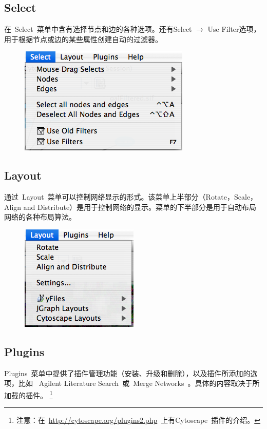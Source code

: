 	\subsection{Select}
	在~Select~菜单中含有选择节点和边的各种选项。还有Select $\rightarrow$ Use Filter选项，用于根据节点或边的某些属性创建自动的过滤器。

	\begin{figure}[!h]
	\centerline{\includegraphics[scale=0.6]{images/menu_select_26.png}}
	\end{figure}

	\subsection{Layout}
	通过~Layout~菜单可以控制网络显示的形式。该菜单上半部分（Rotate，Scale，Align and
	 Distribute）是用于控制网络的显示。菜单的下半部分是用于自动布局网络的各种布局算法。

	\begin{figure}[!h]
	\centerline{\includegraphics[scale=0.6]{images/menu_layout_25.png}}
	\end{figure}
	
		
	
	\subsection{Plugins}
	Plugins~菜单中提供了插件管理功能（安装、升级和删除），以及插件所添加的选项，比如
	~Agilent Literature Search~或~Merge Networks~。具体的内容取决于所加载的插件。
	\footnote{注意：在~\href{http://cytoscape.org/plugins2.php}
	{http://cytoscape.org/plugins2.php}~上有Cytoscape~插件的介绍。}
	
